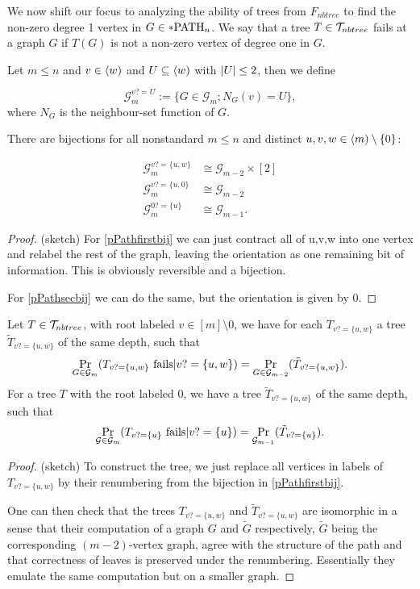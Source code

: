 We now shift our focus to analyzing the ability of trees from $F_{nbtree}$ to find the non-zero degree 1 vertex in $G\in *\text{PATH}_n$. We say that a tree $T\in \mathcal{T}_{nbtree}$ fails at a graph $G$ if $T(G)$ is not a non-zero vertex of degree one in $G$.

\begin{defi}
Let $m\leq n$ and $v\in \langle w)$ and $U\subseteq \langle w)$ with $\left|{U}\right|\leq 2$, then we define 

\[\mathcal{G}_m^{v?=U}:=\{G\in\mathcal{G}_m;N_G(v)=U\},\]
where $N_G$ is the neighbour-set function of $G$.
\end{defi}
\begin{lemm}
There are bijections for all nonstandard $m\leq n$ and distinct $u,v,w\in \langle m)\setminus\{0\}$:

\begin{align}
\mathcal{G}_m^{v?=\{u,w\}}&\cong\mathcal{G}_{m-2}\times [2] \label{pPathfirstbij}\\
\mathcal{G}_m^{v?=\{u,0\}}&\cong\mathcal{G}_{m-2}\label{pPathsecbij}\\
\mathcal{G}_m^{0?=\{u\}}&\cong\mathcal{G}_{m-1}\label{pPaththrdbij}.
\end{align}
\end{lemm}
\begin{proof} (sketch)
For \eqref{pPathfirstbij} we can just contract all of {u,v,w} into one vertex and relabel the rest of the graph, leaving the orientation as one remaining bit of information. This is obviously reversible and a bijection.

For \eqref{pPathsecbij} we can do the same, but the orientation is given by $0$.
\end{proof}

\begin{lemm}\label{lemmrelabeltree}
Let $T\in \mathcal{T}_{nbtree}$, with root labeled $v\in[m]\setminus{0}$, we have for each $T_{v?=\{u,w\}}$ a tree $\tilde T_{v?=\{u,w\}}$ of the same depth, such that
\begin{align}
\Pr_{G\in\mathcal{G}_m}(T_{v?=\{u,w\}}\text{ fails}|v?=\{u,w\})=\Pr_{G\in\mathcal{G}_{m-2}}(\tilde T_{v?=\{u,w\}}).
\end{align}
For a tree $T$ with the root labeled $0$, we have a tree $\tilde T_{v?=\{u,w\}}$ of the same depth, such that
\begin{align}
\Pr_{\mathcal{G}\in\mathcal{G}_m}(T_{v?=\{u\}}\text{ fails}|v?=\{u\})=\Pr_{\mathcal{G}_{m-1}}(\tilde T_{v?=\{u\}}).
\end{align}
\end{lemm}
\begin{proof}(sketch) To construct the tree, we just replace all vertices in labels of $T_{v?=\{u,w\}}$ by their renumbering from the bijection in \eqref{pPathfirstbij}.

One can then check that the trees $T_{v?=\{u,w\}}$ and $\tilde T_{v?=\{u,w\}}$ are isomorphic in a sense that their computation of a graph $G$ and $\tilde G$ respectively, $\tilde G$ being the corresponding $(m-2)$-vertex graph, agree with the structure of the path and that correctness of leaves is preserved under the renumbering. Essentially they emulate the same computation but on a smaller graph.
\end{proof}


